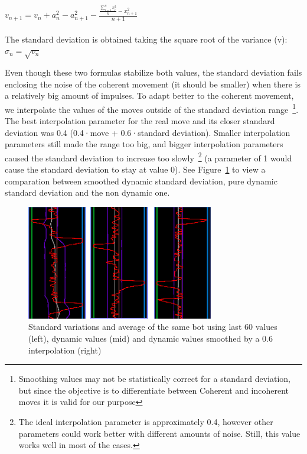 \vspace{5mm}

$ {\displaystyle v_{n+1} = v_n + a_n^2-a_{n+1}^2 - \frac{\frac{\sum_{i=1}^{n}x_i^2}{n} - x_{n+1}^2}{n+1} } $\\\\

\noindent
The standard deviation is obtained taking the square root of the variance (v): $\sigma_n=\sqrt{v_n}$

Even though these two formulas stabilize both values, the standard deviation fails enclosing the noise of the coherent movement (it should be smaller) when there is a relatively big amount of impulses. To adapt better to the coherent movement, we interpolate the values of the moves outside of the standard deviation range~\footnote{Smoothing values may not be statistically correct for a standard deviation, but since the objective is to differentiate between Coherent and incoherent moves it is valid for our purpose}. The best interpolation parameter for the real move and its closer standard deviation was 0.4 (0.4·move + 0.6·standard deviation). Smaller interpolation parameters still made the range too big, and bigger interpolation parameters caused the standard deviation to increase too slowly~\footnote{The ideal interpolation parameter is approximately 0.4, however other parameters could work better with different amounts of noise. Still, this value works well in most of the cases.} (a parameter of 1 would cause the standard deviation to stay at value 0). See Figure~\ref{fig:stdVariations} to view a comparation between smoothed dynamic standard deviation, pure dynamic standard deviation and the non dynamic one.

\begin{figure}[h]
  \centering
		\includegraphics[width=.6\textwidth]{img/stdVariations.png}
  \caption{Standard variations and average of the same bot using last 60 values (left), dynamic values (mid) and dynamic values smoothed by a 0.6 interpolation (right)}
  \label{fig:stdVariations}
\end{figure}

